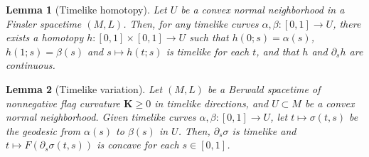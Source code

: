 \documentclass[10pt,a4paper]{amsart}
\newtheorem{lemma}{Lemma}
\newcommand{\bK}{\mathbf{K}}
\newcommand{\del}{\partial}
\newcommand{\lra}{\longrightarrow}
\begin{document}
\begin{lemma}[Timelike homotopy]
\label{lem: timelike homotopy}
Let $U$ be a convex normal neighborhood in a Finsler spacetime $(M,L)$.
Then, for any timelike curves $\alpha,\beta \colon [0,1] \lra U$,
there exists a homotopy $h\colon [0,1] \times [0,1] \lra U$ such that $h(0;s)=\alpha(s)$, $h(1;s)=\beta(s)$ and $s \longmapsto h(t;s)$ is timelike for each $t$,
and that $h$ and $\partial_s h$ are continuous.
\end{lemma}

\begin{lemma}[Timelike variation]
\label{lem: VtimeGen}
Let $(M,L)$ be a Berwald spacetime of nonnegative flag curvature $\bK \ge 0$ in timelike directions,
and $U \subset M$ be a convex normal neighborhood.
Given timelike curves $\alpha,\beta\colon [0,1] \lra U$, let $t\longmapsto \sigma(t,s)$ be the geodesic from $\alpha(s)$ to $\beta(s)$ in $U$.
Then, $\partial_s \sigma$ is timelike and $t \longmapsto F(\del_s \sigma(t,s))$ is concave for each $s \in [0,1]$.
\end{lemma}
\end{document}
